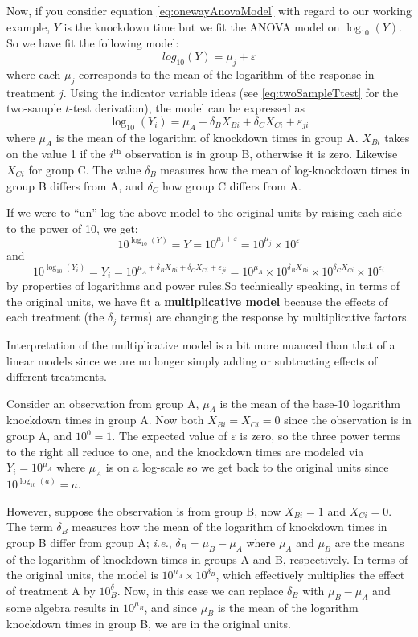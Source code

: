 \documentclass[
]{book}
\begin{document}
Now, if you consider equation \eqref{eq:onewayAnovaModel} with regard to our working example, \(Y\) is the knockdown time but we fit the ANOVA model on \(\log_{10}(Y)\).
So we have fit the following model:
\[log_{10}(Y) = \mu_j + \varepsilon\]
where each \(\mu_j\) corresponds to the mean of the logarithm of the response in treatment \(j\).
Using the indicator variable ideas (see \eqref{eq:twoSampleTtest} for the two-sample \(t\)-test derivation), the model can be expressed as
\[\log_{10}(Y_{i}) = \mu_A + \delta_B X_{Bi} + \delta_C X_{Ci} + \varepsilon_{ji}\]
where \(\mu_A\) is the mean of the logarithm of knockdown times in group A. \(X_{Bi}\) takes on the value 1 if the \(i^\mathrm{th}\) observation is in group B, otherwise it is zero. Likewise \(X_{Ci}\) for group C. The value \(\delta_B\) measures how the mean of log-knockdown times in group B differs from A, and \(\delta_C\) how group C differs from A.

If we were to ``un''-log the above model to the original units by raising each side to the power of 10, we get:
\[10^{\log_{10}(Y)} = Y = 10^{\mu_j + \varepsilon} = 10^{\mu_j}\times 10^\varepsilon\]
and
\[10^{\log_{10}(Y_i)} = Y_i = 10^{\mu_A + \delta_B X_{Bi} + \delta_C X_{Ci} + \varepsilon_{ji}} = 10^{\mu_A} \times 10^{\delta_B X_{Bi}}\times 10^{\delta_C X_{Ci}} \times 10^{\varepsilon_{i}}\]
by properties of logarithms and power rules.So technically speaking, in terms of the original units, we have fit a \textbf{multiplicative model} because the effects of each treatment (the \(\delta_j\) terms) are changing the response by multiplicative factors.

Interpretation of the multiplicative model is a bit more nuanced than that of a linear models since we are no longer simply adding or subtracting effects of different treatments.

Consider an observation from group A, \(\mu_A\) is the mean of the base-10 logarithm knockdown times in group A. Now both \(X_{Bi} = X_{Ci} = 0\) since the observation is in group A, and \(10^0 = 1\). The expected value of \(\varepsilon\) is zero, so the three power terms to the right all reduce to one, and the knockdown times are modeled via \(Y_i = 10^{\mu_A}\) where \(\mu_A\) is on a log-scale so we get back to the original units since \(10^{\log_{10}(a)}=a\).

However, suppose the observation is from group B, now \(X_{Bi}=1\) and \(X_{Ci}=0\).
The term \(\delta_B\) measures how the mean of the logarithm of knockdown times in group B differ from group A; \emph{i.e.}, \(\delta_B = \mu_B - \mu_A\) where \(\mu_A\) and \(\mu_B\) are the means of the logarithm of knockdown times in groups A and B, respectively.
In terms of the original units, the model is \(10^{\mu_A}\times 10^{\delta_B}\), which effectively multiplies the effect of treatment A by \(10^\delta_B\).
Now, in this case we can replace \(\delta_B\) with \(\mu_B - \mu_A\) and some algebra results in \(10^{\mu_B}\), and since \(\mu_B\) is the mean of the logarithm knockdown times in group B, we are in the original units.
\end{document}

